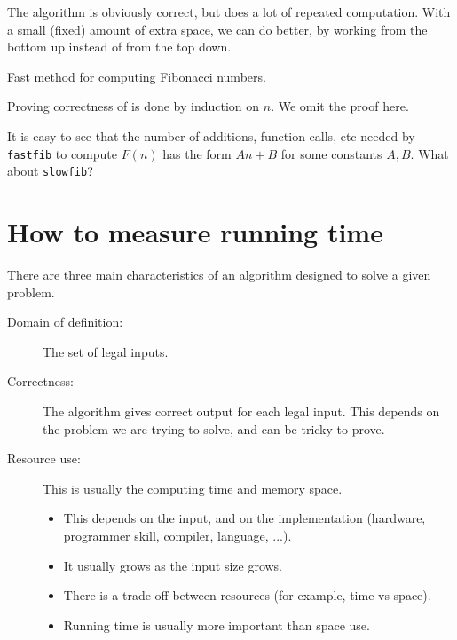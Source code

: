 The algorithm  is obviously correct, but does a lot of repeated computation. 
With a small (fixed) amount of extra space, we can do better, 
by working from the bottom up instead of from the top down.

\begin{algorithm}[H]
  \caption{Fast method for computing Fibonacci numbers.}
    \label{alg:fastfib}
\begin{algorithmic}[1]
	\Else
		 	
		  
		\EndFor
	\EndIf
	\State {}
\EndFunction
\end{algorithmic}
\end{algorithm}
 
Proving correctness of  is done by induction on $n$.  We omit the proof here.
\begin{Boxample}[6]
It is easy to see that the number of additions, function calls, etc needed by 
\texttt{fastfib} to compute $F(n)$ has the form $An + B$ for some constants $A, B$.
What about \texttt{slowfib}?
\end{Boxample}


\chapter{How to measure running time} %
There are three main characteristics of an algorithm designed to solve a given problem.
\begin{description}
	\item[Domain of definition:] The set of legal inputs. 
	\item[Correctness:] The algorithm gives correct output for each legal input. 
	This depends on the problem we are trying to solve, and can be tricky to prove. 
	\item[Resource use:] This is usually the computing time and memory space. 
	\begin{itemize} 
		\item This depends on the input, and on the implementation 
		(hardware, programmer skill, compiler, language, ...). 
		\item It usually grows as the input size grows. 
		\item There is a trade-off between resources (for example, time vs space). 
		\item Running time is usually more important than space use. 
	\end{itemize}
\end{description}

